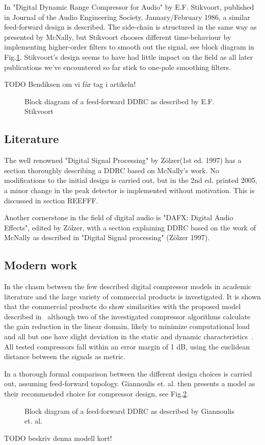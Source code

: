 \documentclass[]{article}
\begin{document}
In "Digital Dynamic Range Compressor for Audio" by E.F. Stikvoort, published in  Journal of the Audio Engineering Society, January/February 1986, a similar feed-forward design is described. The side-chain is structured in the same way as presented by McNally, but Stikvoort chooses different time-behaviour by implementing higher-order filters to smooth out the signal, see block diagram in Fig.\ref{fig:stikvoortBlock}. Stikvoort's design seems to have had little impact on the field as all later publications we've encountered so far stick to one-pole smoothing filters.

TODO Bendiksen om vi får tag i artikeln!

\begin{figure}
\caption{Block diagram of a feed-forward DDRC as described by E.F. Stikvoort}
\label{fig:stikvoortBlock}
\end{figure}

\subsection*{Literature}
The well renowned "Digital Signal Processing" by Zölzer(1st ed. 1997) has a section thoroughly describing a DDRC based on McNally's work. No modifications to the initial design is carried out, but in the 2nd ed. printed 2005, a minor change in the peak detector is implemented without motivation. This is discussed in section REEFFF.

Another cornerstone in the field of digital audio is "DAFX: Digital Audio Effects", edited by Zölzer, with a section explaining DDRC based on the work of McNally as described in "Digital Signal processing" (Zölzer 1997).

\subsection*{Modern work}
In \cite{bitzer2006parameter} the chasm between the few described digital compressor models in academic literature and the large variety of commercial products is investigated. It is shown that the commercial products do show similarities with the proposed model described in~\cite{mcnally1984dynamic}\cite{zolzer1997digital}\cite{dafx} although two of the investigated compressor algorithms calculate the gain reduction in the linear domain, likely to minimize computational load and all but one have slight deviation in the static and dynamic characteristics~\cite{bitzer2006parameter}. All tested compressors fall within an error margin of 1 dB, using the euclidean distance between the signals as metric.

In \cite{reiss2012tutorial} a thorough formal comparison between the different design choices is carried out, assuming feed-forward topology. Giannoulis et. al.  then presents a model as their recommended choice for compressor design, see Fig.\ref{fig:gian_ddrc_block}.
\begin{figure}
\caption{Block diagram of a feed-forward DDRC as described by Giannoulis et. al.}
\label{fig:gian_ddrc_block}
\end{figure}

TODO beskriv denna modell kort!


\end{document}

